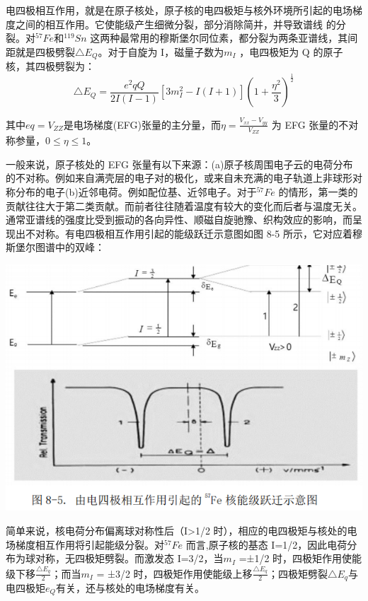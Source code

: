 \documentclass[hyperref]{ctexart}
\begin{document}
\begin{multicols}{2}
	电四极相互作用，就是在原子核处，原子核的电四极矩与核外环境所引起的电场梯度之间的相互作用。它使能级产生细微分裂，部分消除简并，并导致谱线
的分裂。对$^{57}Fe$和$^{119}Sn$ 这两种最常用的穆斯堡尔同位素，都分裂为两条亚谱线，其间距就是四极劈裂$\triangle E_Q$。对于自旋为 I，磁量子数为$m_I$ ，电四极矩为 Q 的原子核，其四极劈裂为：
	\begin{equation}
	\triangle E_Q=\frac{e^2qQ}{2I(I-1)}[3m^2_I-I(I+1)](1+\frac{\eta^2}{3})^{\frac1 2}
	\end{equation}

	其中$eq=V_{ZZ}$是电场梯度(EFG)张量的主分量，而$\eta=\frac{V_{xx}-V_{yy} }{V_{ZZ}}$ 为 EFG 张量的不对称参量，$0\leq \eta \leq 1$。

	一般来说，原子核处的 EFG 张量有以下来源：(a)原子核周围电子云的电荷分布的不对称。例如来自满壳层的电子对的极化，或来自未充满的电子轨道上非球形对称分布的电子(b)近邻电荷。例如配位基、近邻电子。对于$^{57}Fe$ 的情形，第一类的贡献往往大于第二类贡献。而前者往往随着温度有较大的变化而后者与温度无关。通常亚谱线的强度比受到振动的各向异性、顺磁自旋驰豫、织构效应的影响，而呈现出不对称。有电四极相互作用引起的能级跃迁示意图如图 8-5 所示，它对应着穆斯堡尔图谱中的双峰：
	
	\begin{center}\includegraphics[scale=0.3]{t85.png}\end{center}
	简单来说，核电荷分布偏离球对称性后（I>1/2 时），相应的电四极矩与核处的电场梯度相互作用将引起能级分裂。对$^{57}Fe$ 而言,原子核的基态 I=1/2，因此电荷分布为球对称，无四极矩劈裂。而激发态 I=3/2，当$m_I$ =±1/2 时，四极矩作用使能级下移$\frac{\triangle E_q}{2}$；而当$m_I$ = ±3/2 时，四极矩作用使能级上移$\frac{\triangle E_q}{2}$；四极矩劈裂$\triangle E_q$与电四极矩$e_Q$有关，还与核处的电场梯度有关。
	

\end{multicols}
\end{document}

